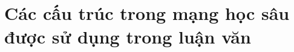 
\section{\texorpdfstring{Các cấu trúc trong mạng học sâu được sử dụng trong luận văn}{dl_basic_structures}}




